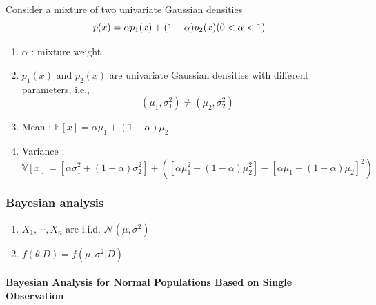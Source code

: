 \begin{theorem}
    Consider a mixture of two univariate Gaussian densities \cite{mfml-1}
    \[
        p(x) = \alpha p_1(x) + (1 - \alpha )p_2(x)    
        \hfill
        (0 < \alpha  < 1)
    \]
    \begin{enumerate}
        \item $\alpha$ : mixture weight
        
        \item $p_1(x)$ and $p_2(x)$ are univariate Gaussian densities with different parameters, i.e., 
        \[
            (\mu_1 , \sigma_1^2) \neq (\mu_2 , \sigma_2^2)
        \]
        
        \item Mean  : $\mathbb{E}[x] = \alpha \mu_1 + (1 - \alpha )\mu_2$
        
        \item Variance : $\mathbb{V}[x] = [\alpha \sigma_1^2 + (1-\alpha )\sigma_2^2] + ([\alpha \mu_1^2 + (1-\alpha )\mu_2^2] - [\alpha \mu_1 + (1-\alpha )\mu_2]^2)$

    \end{enumerate}

\end{theorem}

\subsubsection{Bayesian analysis \cite{ism-1}} \label{Normal distribution: Bivariate/ Multivariate: Bayesian analysis}

\begin{enumerate}
    \item $X_1, \cdots, X_n$ are i.i.d. $\mathcal{N} (\mu, \sigma^2)$

    \item $f(\theta|D) = f(\mu, \sigma^2|D)$
\end{enumerate}

\paragraph{Bayesian Analysis for Normal Populations Based on Single Observation \cite{ism-1}} \label{Bayesian Analysis for Normal Populations Based on Single Observation}

